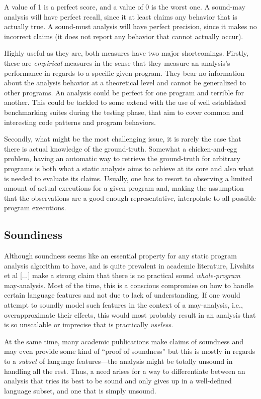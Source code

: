 A value of 1 is a perfect score, and a value of 0 is the worst one. A sound-may
analysis will have perfect recall, since it at least claims any behavior that
is actually true. A sound-must analysis will have perfect precision, since it
makes no incorrect claims (it does not report any behavior that cannot actually
occur).

Highly useful as they are, both measures have two major shortcomings. Firstly,
these are \emph{empirical} measures in the sense that they measure an
analysis's performance in regards to a specific given program. They bear no
information about the analysis behavior at a theoretical level and cannot be
generalized to other programs. An analysis could be perfect for one program and
terrible for another. This could be tackled to some extend with the use of well
established benchmarking suites during the testing phase, that aim to cover
common and interesting code patterns and program behaviors.

Secondly, what might be the most challenging issue, it is rarely the case that
there is actual knowledge of the ground-truth. Somewhat a chicken-and-egg
problem, having an automatic way to retrieve the ground-truth for arbitrary
programs is both what a static analysis aims to achieve at its core and also
what is needed to evaluate its claims. Usually, one has to resort to observing
a limited amount of actual executions for a given program and, making the
assumption that the observations are a good enough representative, interpolate
to all possible program executions.


\subsection{Soundiness}

Although soundness seems like an essential property for any static program
analysis algorithm to have, and is quite prevalent in academic literature,
Livshits et al [...] make a strong claim that there is no practical sound
\emph{whole-program} may-analysis. Most of the time, this is a conscious
compromise on how to handle certain language features and not due to lack of
understanding. If one would attempt to soundly model such features in the
context of a may-analysis, i.e., overapproximate their effects, this would most
probably result in an analysis that is so unscalable or imprecise that is
practically \emph{useless}.

At the same time, many academic publications make claims of soundness and may
even provide some kind of ``proof of soundness'' but this is mostly in regards
to a \emph{subset} of language features---the analysis might be totally unsound
in handling all the rest. Thus, a need arises for a way to differentiate
between an analysis that tries its best to be sound and only gives up in a
well-defined language subset, and one that is simply unsound.

